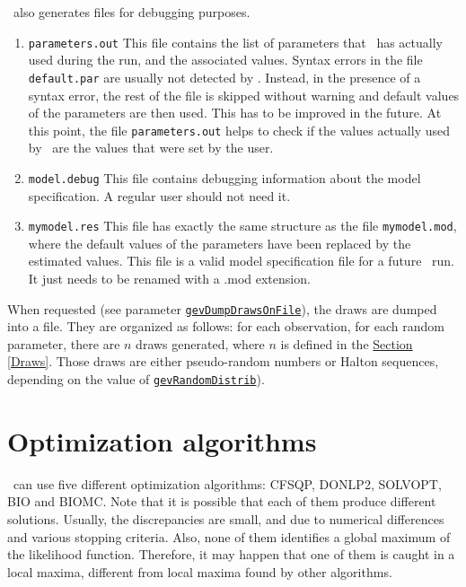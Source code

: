 \documentclass[12pt]{memoir}
\begin{document}
   \BIOGEME\ also generates files for debugging purposes.
   \begin{enumerate}
      \item \texttt{parameters.out} This file contains the list of parameters that
         \BIOGEME\ has actually used during the run, and the associated values. Syntax
         errors in the file \texttt{default.par} are usually not detected by
         \BIOGEME. Instead, in the presence of a syntax error, the rest of the file is
         skipped without warning and default values of the parameters are then
         used. This has to be improved in the future. At this point, the file
         \texttt{parameters.out} helps to check if the values actually used by
         \BIOGEME\ are the values that were  set by the user. 
      \item \texttt{model.debug} This file contains debugging information about the
         model specification. A regular user should not need it.
      \item \texttt{mymodel.res}   This file has exactly the same structure as the
         file \texttt{mymodel.mod}, where the default values of
         the parameters have been replaced by the estimated values. This file is a
         valid model specification file for a future \BIOGEME\ run.  It just needs to be 
         renamed with a .mod extension.
   \end{enumerate}

   When requested (see parameter \hyperlink{gevDumpDrawsOnFile}{\texttt{gevDumpDrawsOnFile}}), 
   the draws are dumped into a file. They are organized as follows:
   for each observation, for each random parameter,  there are $n$ draws
   generated, where $n$ is defined in the \hyperlink{Draws}{Section [Draws]}.
   Those draws are either pseudo-random numbers or Halton sequences,
   depending on the value of \hyperlink{gevRandomDistrib}{\texttt{gevRandomDistrib}}).


\section{Optimization algorithms}
\label{sec:opt}

   \BIOGEME\ can use five different optimization algorithms: CFSQP,
   DONLP2, SOLVOPT, BIO and BIOMC. Note that it is possible that each of them 
   produce different solutions. Usually, the discrepancies are small, and
   due to numerical differences and various stopping criteria. Also, none
   of them identifies a global maximum of the likelihood
   function. Therefore, it may happen that one of them is caught in a
   local maxima, different from local maxima found by other
   algorithms. 
\end{document}

